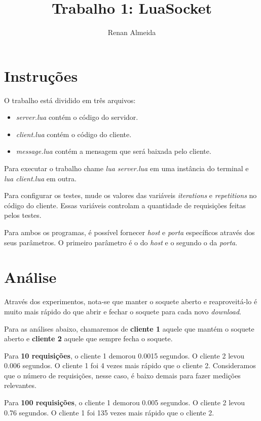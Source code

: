 \documentclass[12pt]{article}
\title{Trabalho 1: LuaSocket}
\author{Renan Almeida}
\begin{document}
\maketitle

\section{Instruções}

O trabalho está dividido em três arquivos:

\begin{itemize}  
    \item \textit{server.lua} contém o código do servidor.
    \item \textit{client.lua} contém o código do cliente.
    \item \textit{message.lua} contém a mensagem que será baixada pelo cliente.
\end{itemize}

Para executar o trabalho chame \textit{lua server.lua} em uma instância do terminal e \textit{lua client.lua} em outra.

Para configurar os testes, mude os valores das variáveis \textit{iterations} e \textit{repetitions} no código do cliente. Essas variáveis controlam a quantidade de requisições feitas pelos testes.

Para ambos os programas, é possível fornecer \textit{host} e \textit{porta} específicos através dos seus parâmetros. O primeiro parâmetro é o do \textit{host} e o segundo o da \textit{porta}.

\section{Análise}

Através dos experimentos, nota-se que manter o soquete aberto e reaproveitá-lo é muito mais rápido do que abrir e fechar o soquete para cada novo \textit{download}.

Para as análises abaixo, chamaremos de \textbf{cliente 1} aquele que mantém o soquete aberto e \textbf{cliente 2} aquele que sempre fecha o soquete.

Para \textbf{10 requisições}, o cliente 1 demorou 0.0015 segundos. O cliente 2 levou 0.006 segundos. O cliente 1 foi 4 vezes mais rápido que o cliente 2. Consideramos que o número de requisições, nesse caso, é baixo demais para fazer medições relevantes.

Para \textbf{100 requisições}, o cliente 1 demorou 0.005 segundos. O cliente 2 levou 0.76 segundos. O cliente 1 foi 135 vezes mais rápido que o cliente 2.
\end{document}
